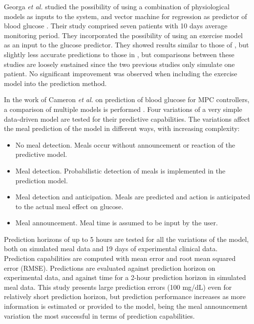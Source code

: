 Georga \textit{et al.} studied the possibility of using a combination of physiological models as inputs to the system, and vector machine for regression as predictor of blood glucose \cite{georga2011glucose}. Their study comprised seven patients with 10 days average monitoring period. They incorporated the possibility of using an exercise model as an input to the glucose predictor. They showed results similar to those of \cite{rollins2010free}, but slightly less accurate predictions to those in \cite{stahl2009diabetes}, but comparisons between these studies are loosely sustained since the two previous studies only simulate one patient. No significant improvement was observed when including the exercise model into the prediction method.

In the work of Cameron \textit{et al.} on prediction of blood glucose for MPC controllers, a comparison of multiple models is performed \cite{cameron2012extended}. Four variations of a very simple data-driven model are tested for their predictive capabilities. The variations affect the meal prediction of the model in different ways, with increasing complexity:
\begin{itemize}
	\item No meal detection. Meals occur without announcement or reaction of the predictive model.
	\item Meal detection. Probabilistic detection of meals is implemented in the prediction model.
	\item Meal detection and anticipation. Meals are predicted and action is anticipated to the actual meal effect on glucose.
	\item Meal announcement. Meal time is assumed to be input by the user.
\end{itemize}
Prediction horizons of up to 5 hours are tested for all the variations of the model, both on simulated meal data and 19 days of experimental clinical data. Prediction capabilities are computed with mean error and root mean squared error (RMSE). Predictions are evaluated against prediction horizon on experimental data, and against time for a 2-hour prediction horizon in simulated meal data. This study presents large prediction errors (100 mg/dL) even for relatively short prediction horizon, but prediction performance increases as more information is estimated or provided to the model, being the meal announcement variation the most successful in terms of prediction capabilities.

